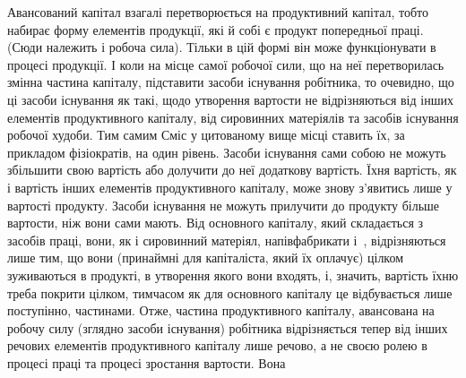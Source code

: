 Авансований капітал взагалі перетворюється на продуктивний капітал,
тобто набирає форму елементів продукції, які й собі є продукт попередньої
праці. (Сюди належить і робоча сила). Тільки в цій формі він
може функціонувати в процесі продукції. І коли на місце самої робочої
сили, що на неї перетворилась змінна частина капіталу, підставити засоби
існування робітника, то очевидно, що ці засоби існування як такі,
щодо утворення вартости не відрізняються від інших елементів продуктивного
капіталу, від сировинних матеріялів та засобів існування робочої
худоби. Тим самим Сміс у цитованому вище місці ставить їх, за прикладом
фізіократів, на один рівень. Засоби існування сами собою не можуть
збільшити свою вартість або долучити до неї додаткову вартість. Їхня
вартість, як і вартість інших елементів продуктивного капіталу, може
знову з’явитись лише у вартості продукту. Засоби існування не можуть
прилучити до продукту більше вартости, ніж вони сами мають. Від основного
капіталу, який складається з засобів праці, вони, як і сировинний
матеріял, напівфабрикати і~, відрізняються лише тим, що вони
(принаймні для капіталіста, який їх оплачує) цілком зуживаються в продукті,
в утворення якого вони входять, і, значить, вартість їхню треба
покрити цілком, тимчасом як для основного капіталу це відбувається
лише поступінно, частинами. Отже, частина продуктивного капіталу,
авансована на робочу силу (зглядно засоби існування) робітника відрізняється
тепер від інших речових елементів продуктивного капіталу лише речово, а
не своєю ролею в процесі праці та процесі зростання вартости. Вона
\parbreak{}  %
